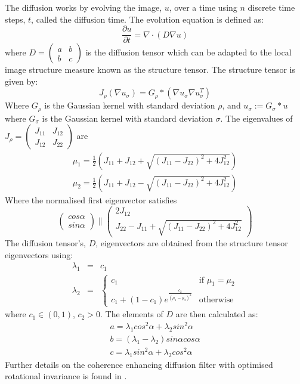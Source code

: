 \documentclass[a4paper,11pt]{ijamas}
\begin{document}
The diffusion works by evolving the image, $u$, over a time using $n$ discrete time steps, $t$, called the diffusion time. The evolution equation is defined as:
\begin{equation}
\frac{\partial u}{\partial t} = \nabla \cdot (D\nabla u)
\end{equation}
where $D = \begin{pmatrix}
a & b \\
b & c
\end{pmatrix}$ is the diffusion tensor which can be adapted to the local image structure measure known as the structure tensor. The structure tensor is given by:
\begin{equation}
J_{\rho}(\nabla u_{\sigma}) = G_{\rho} \ast (\nabla u_{\sigma} \nabla u_{\sigma}^T)
\end{equation}
Where $G_{\rho}$ is the Gaussian kernel with standard deviation $\rho$, and $u_{\sigma} := G_{\sigma} \ast u$ where $G_{\sigma}$ is the Gaussian kernel with standard deviation $\sigma$.
The eigenvalues of $J_{\rho}=\begin{pmatrix}
J_{11} & J_{12} \\
J_{12} & J_{22}
\end{pmatrix}$ are
\begin{eqnarray}
\mu_{1} = \frac{1}{2}\left( J_{11} + J_{12} + \sqrt{(J_{11}-J_{22})^2+4J_{12}^2} \right) \\
\mu_{2} = \frac{1}{2}\left( J_{11} + J_{12} - \sqrt{(J_{11}-J_{22})^2+4J_{12}^2} \right)
\end{eqnarray}
Where the normalised first eigenvector satisfies
\begin{equation}
\begin{pmatrix}
cos \alpha \\
sin \alpha
\end{pmatrix} \parallel
\begin{pmatrix}
2J_{12} \\
J_{22}-J_{11}+\sqrt{(J_{11}-J_{22})^2 + 4J_{12}^2}
\end{pmatrix}
\end{equation}
The diffusion tensor's, $D$, eigenvectors are obtained from the structure tensor eigenvectors using:
\begin{eqnarray}
\lambda_1 &=& c_1 \\
\lambda_2 &=& \left\lbrace \begin{matrix}
c_1 & \text{if } \mu_1=\mu_2 \\
c_1+(1-c_1)e^{\frac{c_2}{(\mu_1-\mu_2)^2}}& \text{otherwise}
\end{matrix}
\right.
\end{eqnarray}
where $c_1 \in (0,1)$, $c_2>0$. The elements of $D$ are then calculated as:
\begin{eqnarray}
a = \lambda_1 cos^2 \alpha + \lambda_2 sin^2 \alpha \\
b = (\lambda_1 - \lambda_2)sin \alpha cos \alpha \\
c = \lambda_1 sin^2 \alpha + \lambda_2 cos^2 \alpha
\end{eqnarray}
Further details on the coherence enhancing diffusion filter with optimised rotational invariance is found in \cite{jweickert:2002}.
\end{document}
